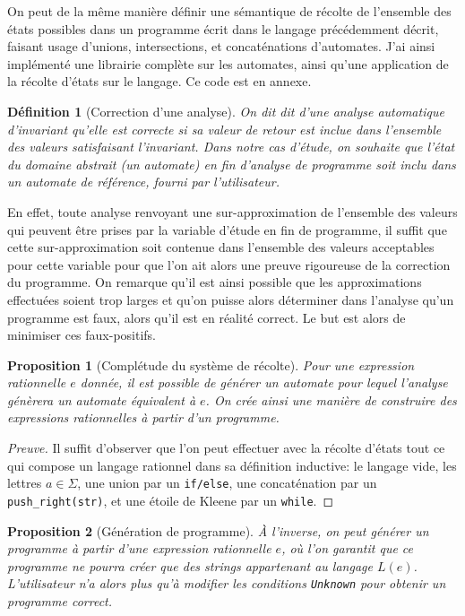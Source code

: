 \documentclass{article}
\newenvironment{preuve}{\begin{proof}[Preuve]}{\end{proof}}
\newtheorem{proposition}{Proposition}
\newtheorem{definition}{Définition}
\begin{document}
On peut de la même manière définir une sémantique de récolte de l'ensemble des états possibles
dans un programme écrit dans le langage précédemment décrit, faisant usage d'unions, intersections,
et concaténations d'automates. J'ai ainsi implémenté une librairie complète sur les automates,
ainsi qu'une application de la récolte d'états sur le langage. Ce code est en annexe.

\begin{definition}[Correction d'une analyse]
    On dit dit d'une analyse automatique d'invariant qu'elle est \emph{correcte}
    si sa valeur de retour est inclue dans l'ensemble des valeurs satisfaisant l'invariant.
    Dans notre cas d'étude, on souhaite que l'état du domaine abstrait (un automate) en fin
    d'analyse de programme soit inclu dans un automate de référence, fourni par l'utilisateur.
\end{definition}

En effet, toute analyse renvoyant une sur-approximation de l'ensemble des valeurs
qui peuvent être prises par la variable d'étude en fin de programme,
il suffit que cette sur-approximation soit contenue dans l'ensemble des valeurs acceptables pour cette variable
pour que l'on ait alors une preuve rigoureuse de la correction du programme.
On remarque qu'il est ainsi possible que les approximations effectuées soient trop larges et qu'on puisse alors
déterminer dans l'analyse qu'un programme est faux, alors qu'il est en réalité correct. Le but est alors de
minimiser ces faux-positifs.

\begin{proposition}[Complétude du système de récolte]
    Pour une expression rationnelle $e$ donnée, il est possible de générer un automate
    pour lequel l'analyse génèrera un automate équivalent à $e$.
    On crée ainsi une manière de construire des expressions rationnelles à partir d'un programme.
\end{proposition}

\begin{preuve}
    Il suffit d'observer que l'on peut effectuer avec la récolte d'états tout ce qui compose
    un langage rationnel dans sa définition inductive: le langage vide, les lettres $a \in \Sigma$,
    une union par un \texttt{if/else}, une concaténation par un \texttt{push\_right(str)}, et une étoile de Kleene par un \texttt{while}.
\end{preuve}

\begin{proposition}[Génération de programme]
    À l'inverse, on peut générer un programme à partir d'une expression rationnelle $e$, où l'on garantit que
    ce programme ne pourra créer que des strings appartenant au langage $L(e)$. L'utilisateur n'a alors plus qu'à modifier les
    conditions \texttt{Unknown} pour obtenir un programme correct.
\end{proposition}
\end{document}
